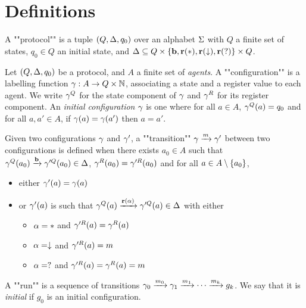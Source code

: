 \section{Definitions}

\begin{definition}
	A ""protocol"" is a tuple $(Q, \D, q_0)$ over an alphabet $\S$ with $Q$ a finite set of states, $q_0 \in Q$ an initial state, and $\D \subseteq Q \times \set{\br, \rec(*), \rec(\cp), \rec(\testeq)} \times Q$.
\end{definition}

\begin{definition}
	Let $(Q,\D, q_0)$ be a protocol, and $A$ a finite set of \emph{agents}.
	A ""configuration"" is a labelling function $\g : A \to Q \times \nats$, associating a state and a register value to each agent. We write $\g^Q$ for the state component of $\g$ and $\g^R$ for its register component.
	An \emph{initial configuration} $\g$ is one where for all $a \in A$, $\g^Q(a) = q_0$ and for all $a, a' \in A$, if $\g(a) = \g(a')$ then $a=a'$.
	
	\AP Given two configurations $\g$ and $\g'$, a ""transition"" $\g 
	\act{m} \g'$ between two configurations is defined when there exists $a_0 \in A$ such that $\g^Q(a_0) \act{\br} \g'^Q(a_0) \in \D$, $\g^R(a_0) = \g'^R(a_0)$ and for all $a \in A\setminus \set{a_0}$,  
	\begin{itemize}
		\item either $\g'(a) = \g(a)$
		
		\item or $\g'(a)$ is such that $\g^Q(a) \act{\rec(\a)} \g'^Q(a) \in \D$ with either
		\begin{itemize}
			\item $\a = *$ and $\g'^R(a) = \g^{R}(a)$
			\item $\a = \cp$ and $\g'^R(a) = m$
			\item $\a = \testeq$ and $\g'^R(a) = \g^R(a) =m$
		\end{itemize}
	\end{itemize}

	\AP A ""run"" is a sequence of transitions $\g_0 \act{m_0} \g_1 \act{m_1} \cdots \act{m_k} g_k$. We say that it is \emph{initial} if $g_0$ is an initial configuration.
\end{definition}

